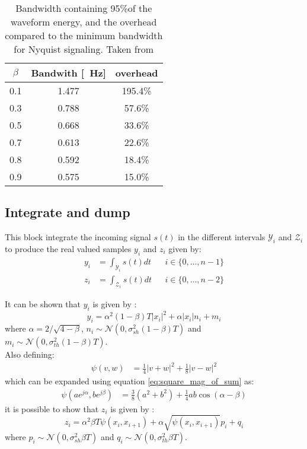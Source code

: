 \begin{table}[htp]
\begin{center}
\begin{tabular}{|c|c|c|}\hline
$\beta$&Bandwith [\SI{}{\Hz}]&overhead\\\hline
0.1&1.477&195.4\%\\\hline
0.3&0.788&57.6\%\\\hline
0.5&0.668&33.6\%\\\hline
0.7&0.613&22.6\%\\\hline
0.8&0.592&18.4\%\\\hline
0.9&0.575&15.0\%\\\hline
\end{tabular}
\end{center}
\caption{Bandwidth containing 95\%of the waveform energy, and the overhead compared to the minimum bandwidth for Nyquist signaling. Taken from \cite{Tasbihi_Tukey}}
\label{tab:BW_Tukey_window}
\end{table}%

\subsection{Integrate and dump}

This block integrate the incoming signal $s(t)$ in the different intervals $\mathcal{Y}_i$ and $\mathcal{Z}_i$ to produce the real valued samples $y_i$ and $z_i$ given by:
\begin{align}
	y_i&=\int_{\mathcal Y_i}s(t)dt&&i\in \{0,\dotsc,n-1\}\\
	z_i&=\int_{\mathcal Z_i}s(t)dt&&i\in \{0,\dotsc,n-2\}
\end{align}

It can be shown that $y_i$ is given by \cite{Tasbihi_Tukey}:
\begin{equation}
y_i=\alpha^2(1-\beta)T|x_i|^2+\alpha|x_i|n_i+m_i
	\label{eq:y_i_Tukey}
\end{equation}
where $\alpha=2/\sqrt{4-\beta}$, $n_i\sim\mathcal N(0,\sigma^2_{sh}(1-\beta)T)$ and $m_i\sim\mathcal N(0,\sigma^2_{th}(1-\beta)T)$.\\

Also defining:
\begin{align}
\psi(v,w)&=\frac{1}{4}|v+w|^2 + \frac{1}{8}|v-w|^2
\end{align}
which can be expanded using equation \ref{eq:square_mag_of_sum} as:
\begin{align}
\psi(ae^{j\alpha},be^{j\beta})&=\frac{3}{8}\left(a^2+b^2\right)+\frac{1}{4}ab\cos(\alpha-\beta)
\end{align}
 it is possible to show that $z_i$ is given by \cite{Tasbihi_Tukey}:
\begin{equation}
	z_i=\alpha^2\beta T\psi(x_i,x_{i+1})+\alpha\sqrt{\psi(x_i,x_{i+1})}p_i +q_i
	\label{eq:z_i_Tukey}
\end{equation}
where $p_i\sim\mathcal N(0,\sigma^2_{sh}\beta T)$ and $q_i\sim\mathcal N(0,\sigma^2_{th}\beta T)$.\\

